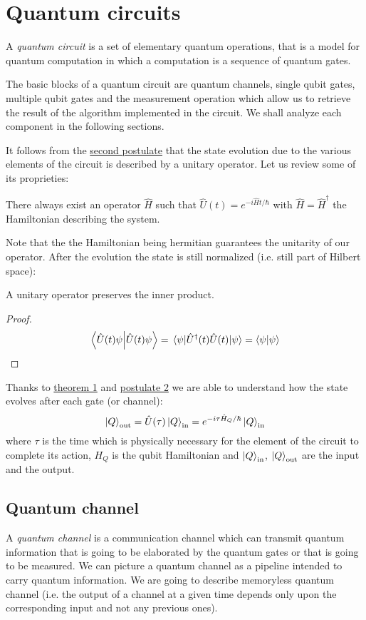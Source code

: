 \section{Quantum circuits}
A \emph{quantum circuit} is a set of elementary quantum operations, that is a model for quantum computation in which a computation is a sequence of quantum gates.

The basic blocks of a quantum circuit are quantum channels, single qubit gates, multiple qubit gates and the measurement operation which allow us to retrieve the result of the algorithm implemented in the circuit. We shall analyze each component in the following sections.

It follows from the \hyperref[postulate:2]{second postulate} that the state evolution due to the various elements of the circuit is described by a unitary operator. Let us review some of its proprieties: 
\begin{theorem}\label{theorem:1}
There always exist an operator $\hat{H}$ such that $\hat{U}(t) = e^{-i\hat{H}t/\hbar}$ with $\hat{H} = \hat{H}^\dagger$ the Hamiltonian describing the system. \cite[p.145]{Shankar}
\end{theorem}

Note that the the Hamiltonian being hermitian guarantees the unitarity of our operator. After the evolution the state is still normalized (i.e. still part of Hilbert space):
\begin{theorem}
A unitary operator preserves the inner product.
\end{theorem}
\begin{proof}
\begin{equation*}
    \bra{\hat{U}(t)\psi}\ket{\hat{U}(t)\psi} = \expval{\hat{U}^\dagger(t)\hat{U}(t)}{\psi} = \braket{\psi}
\end{equation*}
\end{proof}
Thanks to \hyperref[theorem:1]{theorem 1} and \hyperref[postulate:2]{postulate 2} we are able to understand how the state evolves after each gate (or channel):
\begin{equation}\label{eq:evolution}
     \ket{Q}_\text{out} = \hat{U}(\tau) \ket{Q}_\text{in} = e^{-i\tau\hat{H}_Q/\hbar} \ket{Q}_\text{in}
\end{equation}
where $\tau$ is the time which is physically necessary for the element of the circuit to complete its action, $H_Q$ is the qubit Hamiltonian and $\ket{Q}_\text{in}$, $\ket{Q}_\text{out}$ are the input and the output.
\subsection{Quantum channel}
A \emph{quantum channel} is a communication channel which can transmit quantum information that is going to be elaborated by the quantum gates or that is going to be measured. We can picture a quantum channel as a pipeline intended to carry quantum information. We are going to describe memoryless quantum channel (i.e. the output of a channel at a given time depends only upon the corresponding input and not any previous ones).

